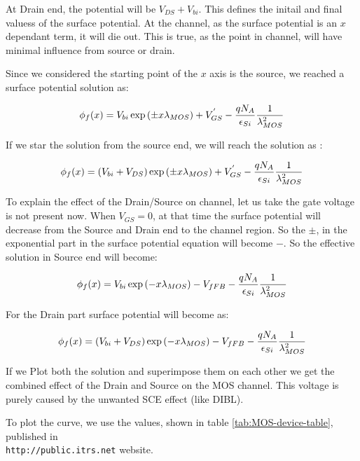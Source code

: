 \documentclass[a4paper]{article}
\begin{document}
At Drain end, the potential will be $V_{DS} + V_{bi}$. This defines the initail and final valuess of the surface potential. At the channel, as the surface potential is an $x$ dependant term, it will die out. This is true, as the point in channel, will have minimal influence from source or drain.

Since we considered the starting point of the $x$ axis is the source, we reached a surface potential solution as:

\begin{equation}
  \phi_f(x) = V_{bi} \exp \left({\pm x \lambda_{MOS}}\right) + V_{GS}^{'} - \frac{qN_A} {\epsilon_{Si}} \frac{1}{\lambda_{MOS}^2}
\end{equation}

If we star the solution from the source end, we will reach the solution as :

\begin{equation}
  \phi_f(x) = (V_{bi} + V_{DS}) \exp \left({\pm x \lambda_{MOS}}\right) + V_{GS}^{'} - \frac{qN_A} {\epsilon_{Si}} \frac{1}{\lambda_{MOS}^2}
\end{equation}

To explain the effect of the Drain/Source on channel, let us take the gate voltage is not present now. When $V_{GS}=0$, at that time the surface potential will decrease from the Source and Drain end to the channel region. So the $\pm$, in the exponential part in the surface potential equation will become $-$. So the effective solution in Source end will become:

\begin{equation}
  \label{eq:MOS-sur-pot-S}
  \phi_f(x) = V_{bi} \exp \left({- x \lambda_{MOS}}\right) - V_{fFB} - \frac{qN_A} {\epsilon_{Si}} \frac{1}{\lambda_{MOS}^2}
\end{equation}

For the Drain part surface potential will become as:

\begin{equation}
  \label{eq:MOS-sur-pot-D}
  \phi_f(x) = (V_{bi} + V_{DS}) \exp \left({- x \lambda_{MOS}}\right) - V_{fFB} - \frac{qN_A} {\epsilon_{Si}} \frac{1}{\lambda_{MOS}^2}
\end{equation}

If we Plot both the solution and superimpose them on each other we get the combined effect of the Drain and Source on the MOS channel.
This voltage is purely caused by the unwanted SCE effect (like DIBL).

To plot the curve, we use the values, shown in table \ref{tab:MOS-device-table}, published in\\ \texttt{http://public.itrs.net} \cite{web:ITRS} website.
\end{document}
